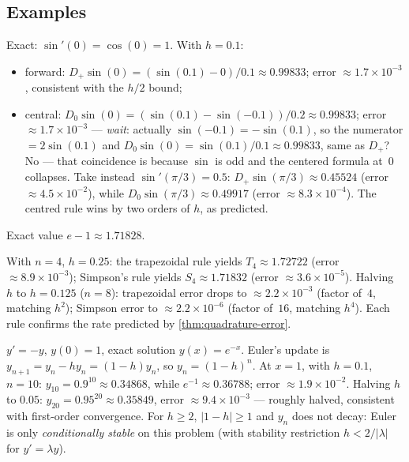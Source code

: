 \subsection*{Examples}

\begin{example}
\label{ex:diff-sin}
Exact: $\sin'(0) = \cos(0) = 1$. With $h = 0.1$:
\begin{itemize}
  \item forward: $D_+ \sin(0) = (\sin(0.1) - 0)/0.1 \approx 0.99833$;
        error $\approx 1.7 \times 10^{-3}$, consistent with the $h/2$
        bound;
  \item central: $D_0 \sin(0) = (\sin(0.1) - \sin(-0.1))/0.2 \approx 0.99833$;
        error $\approx 1.7 \times 10^{-3}$ —
        \emph{wait}: actually $\sin(-0.1) = -\sin(0.1)$, so the
        numerator $= 2 \sin(0.1)$ and $D_0 \sin(0) = \sin(0.1)/0.1 \approx 0.99833$,
        same as $D_+$? No — that coincidence is because $\sin$ is odd
        and the centered formula at~$0$ collapses. Take instead
        $\sin'(\pi/3) = 0.5$: $D_+ \sin(\pi/3) \approx 0.45524$
        (error $\approx 4.5 \times 10^{-2}$), while
        $D_0 \sin(\pi/3) \approx 0.49917$ (error
        $\approx 8.3 \times 10^{-4}$). The centred rule wins by two
        orders of $h$, as predicted.
\end{itemize}
\end{example}

\begin{example}
\label{ex:quadrature-exp}
Exact value $e - 1 \approx 1.71828$.

With $n = 4$, $h = 0.25$: the trapezoidal rule yields
$T_4 \approx 1.72722$ (error $\approx 8.9 \times 10^{-3}$); Simpson's
rule yields $S_4 \approx 1.71832$ (error $\approx 3.6 \times 10^{-5}$).
Halving~$h$ to $h = 0.125$ ($n = 8$): trapezoidal error drops to
$\approx 2.2 \times 10^{-3}$ (factor of~$4$, matching $h^2$); Simpson
error to $\approx 2.2 \times 10^{-6}$ (factor of~$16$, matching
$h^4$). Each rule confirms the rate predicted by
\cref{thm:quadrature-error}.
\end{example}

\begin{example}[Euler's method on the model problem $y' = -y$]
\label{ex:euler-model}
$y' = -y$, $y(0) = 1$, exact solution $y(x) = e^{-x}$. Euler's
update is $y_{n+1} = y_n - h y_n = (1 - h) y_n$, so
$y_n = (1 - h)^n$. At $x = 1$, with $h = 0.1$, $n = 10$:
$y_{10} = 0.9^{10} \approx 0.34868$, while $e^{-1} \approx 0.36788$;
error $\approx 1.9 \times 10^{-2}$. Halving $h$ to $0.05$:
$y_{20} = 0.95^{20} \approx 0.35849$, error $\approx 9.4 \times 10^{-3}$
— roughly halved, consistent with first-order convergence.
For $h \geq 2$, $|1 - h| \geq 1$ and $y_n$ does not decay: Euler
is only \emph{conditionally stable} on this problem (with stability
restriction $h < 2/|\lambda|$ for $y' = \lambda y$).
\end{example}

